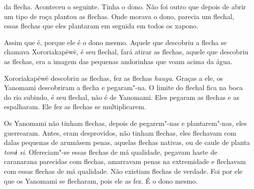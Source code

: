  

 da flecha. Aconteceu o seguinte. Tinha o dono. Não foi outro
que depois de abrir um tipo de roça plantou as flechas. Onde morava o
dono, parecia um flechal, essas flechas que eles plantaram em seguida em
todos os xapono\emph{.}

Assim que é, porque ele é o dono mesmo. Aquele que descobriu a flecha se
chamava Xororiakapëwë, é seu flechal, fará atirar as flechas, aquele que
descobriu as flechas, era a imagem das pequenas andorinhas que voam
acima da água. 

Xororiakapëwë descobriu as flechas, fez as flechas \emph{hauya}. Graças
a ele, os Yanomami descobriram a flecha e pegaram"-na. O limite do
flechal fica na boca do rio subindo, é seu flechal, não é de Yanomami.
Eles pegaram as flechas e as espalharam. Ele fez as flechas se
multiplicarem. 

Os Yanomami não tinham flechas, depois de pegarem"-nas e plantarem"-nas,
eles guerrearam. Antes, eram desprovidos, não tinham flechas, eles
flechavam com dalas pequenas de arumãsem penas, aquelas flechas nativas,
ou de caule de planta \emph{tomɨ si}. Ofereciam"-se essas flechas de má
qualidade, pegavam haste de caranarana parecidas com flechas, amarravam
penas na extremidade e flechavam com essas flechas de má qualidade. Não
existiam flechas de verdade. Foi por ele que os Yanomami se flecharam,
pois ele as fez. É o dono mesmo. 

 
